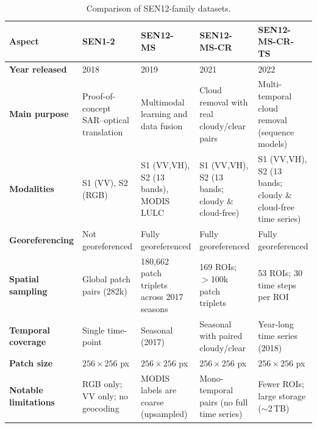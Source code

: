 \begin{table}[!htbp]
    \centering
    \caption{Comparison of SEN12-family datasets.}
    \label{tab:sen12_datasets}
    \setlength{\tabcolsep}{4pt} %
    \renewcommand{\arraystretch}{1.15} %
    \begin{adjustbox}{max width=\textwidth, keepaspectratio=false}
    \begin{tabular}{P{2.6cm} P{3.4cm} P{3.4cm} P{3.6cm} P{3.6cm}}
        \toprule
        \textbf{Aspect} &
        \textbf{SEN1-2}~\cite{sen12_2018} &
        \textbf{SEN12-MS}~\cite{sen12ms_2019} &
        \textbf{SEN12-MS-CR}~\cite{sen12ms-cr_2021} &
        \textbf{SEN12-MS-CR-TS}~\cite{sen12ms-cr-ts_2022} \\
        \midrule
        \textbf{Year released} &
        2018 & 2019 & 2021 & 2022 \\
        \addlinespace[6pt]
        \textbf{Main purpose} &
        Proof-of-concept SAR–optical translation &
        Multimodal learning and data fusion &
        Cloud removal with real cloudy/clear pairs &
        Multi-temporal cloud removal (sequence models) \\
        \addlinespace[6pt]
        \textbf{Modalities} &
        S1 (VV), S2 (RGB) &
        S1 (VV,VH), S2 (13 bands), MODIS LULC &
        S1 (VV,VH), S2 (13 bands; cloudy \& cloud-free) &
        S1 (VV,VH), S2 (13 bands; cloudy \& cloud-free time series) \\
        \addlinespace[6pt]
        \textbf{Georeferencing} &
        Not georeferenced &
        Fully georeferenced &
        Fully georeferenced &
        Fully georeferenced \\
        \addlinespace[6pt]
        \textbf{Spatial sampling} &
        Global patch pairs (282k) &
        180,662 patch triplets across 2017 seasons &
        169 ROIs; $>$100k patch triplets &
        53 ROIs; 30 time steps per ROI \\
        \addlinespace[6pt]
        \textbf{Temporal coverage} &
        Single time-point &
        Seasonal (2017) &
        Seasonal with paired cloudy/clear &
        Year-long time series (2018) \\
        \addlinespace[6pt]
        \textbf{Patch size} &
        $256\times256$ px &
        $256\times256$ px &
        $256\times256$ px &
        $256\times256$ px \\
        \addlinespace[6pt]
        \textbf{Notable limitations} &
        RGB only; VV only; no geocoding &
        MODIS labels are coarse (upsampled) &
        Mono-temporal pairs (no full time series) &
        Fewer ROIs; large storage ($\sim$2\,TB) \\
        \bottomrule
    \end{tabular}
    \end{adjustbox}
\end{table}

